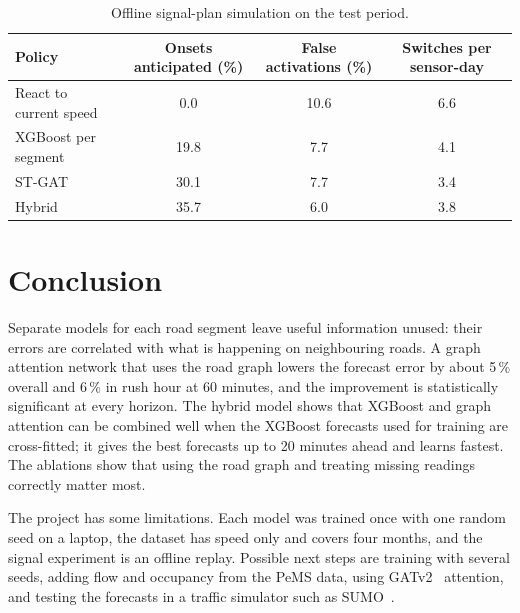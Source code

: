 \documentclass[11pt,a4paper]{article}
\begin{document}
\begin{table}[H]
\centering
\caption{Offline signal-plan simulation on the test period.}
\label{tab:signal}
\small
\begin{tabular}{lccc}
\toprule
Policy & Onsets anticipated (\%) & False activations (\%) & Switches per sensor-day \\
\midrule
React to current speed & 0.0 & 10.6 & 6.6 \\
XGBoost per segment & 19.8 & 7.7 & 4.1 \\
ST-GAT & 30.1 & 7.7 & 3.4 \\
Hybrid & 35.7 & 6.0 & 3.8 \\
\bottomrule
\end{tabular}
\end{table}

\section{Conclusion}
Separate models for each road segment leave useful information unused: their errors are
correlated with what is happening on neighbouring roads. A graph attention network that uses
the road graph lowers the forecast error by about 5\,\% overall and 6\,\% in rush hour at 60
minutes, and the improvement is statistically significant at every horizon. The hybrid model
shows that XGBoost and graph attention can be combined well when the XGBoost forecasts used for
training are cross-fitted; it gives the best forecasts up to 20 minutes ahead and learns
fastest. The ablations show that using the road graph and treating missing readings correctly
matter most.

The project has some limitations. Each model was trained once with one random seed on a
laptop, the dataset has speed only and covers four months, and the signal experiment is an
offline replay. Possible next steps are training with several seeds, adding flow and occupancy
from the PeMS data, using GATv2~\cite{brody2022gatv2} attention, and testing the forecasts in a
traffic simulator such as SUMO~\cite{krajzewicz2012sumo}.



\end{document}
